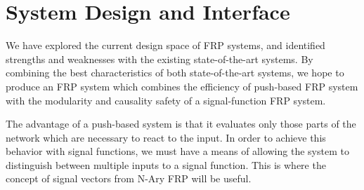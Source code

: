 \chapter{System Design and Interface}
\label{chapter:System_Design_and_Interface}

We have explored the current design space of FRP systems, and identified
strengths and weaknesses with the existing state-of-the-art systems. By
combining the best characteristics of both state-of-the-art systems, we hope
to produce an FRP system which combines the efficiency of push-based FRP system
with the modularity and causality safety of a signal-function FRP system.

The advantage of a push-based system is that it evaluates only those parts
of the network which are necessary to react to the input. In order to achieve
this behavior with signal functions, we must have a means of allowing the system
to distinguish between multiple inputs to a signal function. This is where the
concept of signal vectors from N-Ary FRP will be useful. 